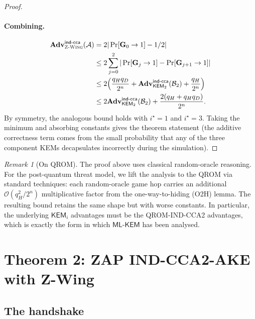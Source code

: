 \documentclass[11pt,a4paper]{article}
\theoremstyle{definition}
\theoremstyle{remark}
\newtheorem{remark}[theorem]{Remark}
\newcommand{\KEM}{\ensuremath{\mathsf{KEM}}}
\newcommand{\Adv}{\ensuremath{\mathbf{Adv}}}
\providecommand{\Game}{}\renewcommand{\Game}{\ensuremath{\mathbf{G}}}
\newcommand{\zwing}{\textsc{Z-Wing}}
\newcommand{\mlkem}{\ensuremath{\mathsf{ML\text{-}KEM}}}
\begin{document}
\begin{proof}
\paragraph{Combining.}
\begin{align*}
\Adv^{\mathsf{ind\text{-}cca}}_{\zwing}(\mathcal{A}) & = 2|\Pr[\Game_0 \to 1] - 1/2| \\
& \le 2 \sum_{j=0}^{2} |\Pr[\Game_j \to 1] - \Pr[\Game_{j+1} \to 1]| \\
& \le 2\!\left(\frac{q_H q_D}{2^n} + \Adv^{\mathsf{ind\text{-}cca}}_{\KEM_2}(\mathcal{B}_2) + \frac{q_H}{2^n}\right) \\
& \le 2 \Adv^{\mathsf{ind\text{-}cca}}_{\KEM_2}(\mathcal{B}_2) + \frac{2(q_H + q_H q_D)}{2^n}.
\end{align*}
By symmetry, the analogous bound holds with $i^\star = 1$ and $i^\star = 3$.
Taking the minimum and absorbing constants gives the theorem statement
(the additive correctness term comes from the small probability that any
of the three component KEMs decapsulates incorrectly during the simulation).
\qedhere
\end{proof}

\begin{remark}[On QROM]
The proof above uses classical random-oracle reasoning. For the post-quantum
threat model, we lift the analysis to the QROM via standard techniques: each
random-oracle game hop carries an additional $\mathcal{O}(q_H^2 / 2^n)$
multiplicative factor from the one-way-to-hiding (O2H) lemma. The resulting
bound retains the same shape but with worse constants. In particular, the
underlying $\KEM_i$ advantages must be the QROM-IND-CCA2 advantages, which
is exactly the form in which $\mlkem$ has been analysed.
\end{remark}

\section{Theorem 2: ZAP IND-CCA2-AKE with Z-Wing}\label{sec:thm2}

\subsection{The handshake}
\end{document}
